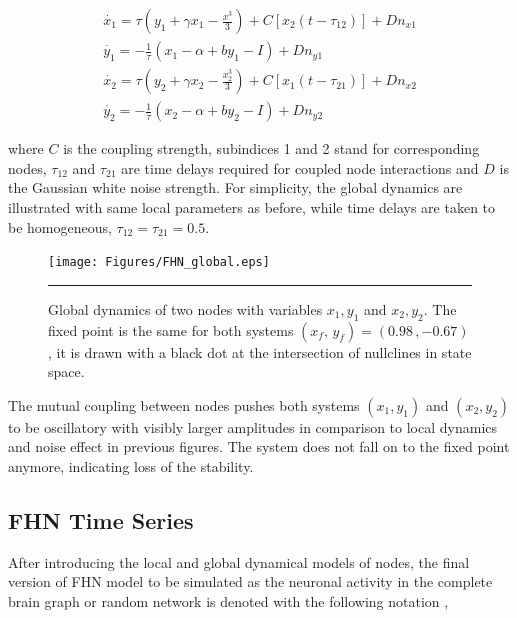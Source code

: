 \begin{subequations}
 \begin{align}\dot{x_1} = \tau (y_1 + \gamma x_1 - \frac{x^3}{3}) + C [x_2(t-\tau_{12})] +Dn_{x1} \label{eqn: frobenius 14}\\  \dot{y_1} = -\frac{1}{\tau} (x_1 - \alpha + b y_1 - I )+ Dn_{y1} \label{eqn: frobenius 15} \\ \dot{x_2} = \tau (y_2 + \gamma x_2 - \frac{x_2^3}{3}) + C [x_1(t-\tau_{21})] + Dn_{x2} \label{eqn: frobenius 16} \\  \dot{y_2} = -\frac{1}{\tau} (x_2 - \alpha + b y_2 - I ) + Dn_{y2}\end{align} 
\end{subequations}
 
where $C$ is the coupling strength, subindices 1 and 2 stand for corresponding nodes, $\tau_{12}$ and $\tau_{21}$ are time delays required for coupled node interactions and $D$ is the Gaussian white noise strength. For simplicity, the global dynamics are illustrated with same local parameters as before, while time delays are taken to be homogeneous, $\tau_{12}=\tau_{21}=0.5$.

\begin{figure}[htbp]
  \centering
	\texttt{[image: Figures/FHN\_global.eps]}
 
    \rule{35em}{0.5pt}
    \caption[FHN Global]{Global dynamics of two nodes with variables $x_1,y_1$ and  $x_2,y_2$. The fixed point is the same for both systems $(x_f, \, y_f) = (0.98 \, , -0.67 )$, it is drawn with a black dot at the intersection of nullclines in state space.}
  \label{fig:FHN Global}	
\end{figure}

The mutual coupling between nodes pushes both systems $(x_1,y_1)$ and $(x_2,y_2)$ to be oscillatory with visibly larger amplitudes in comparison to local dynamics and noise effect in previous figures. The system does not fall on to the fixed point anymore, indicating loss of the stability. 

\subsection{FHN Time Series}

After introducing the local and global dynamical models of nodes, the final version of FHN model to be simulated as the neuronal activity in the complete brain graph or random network is denoted with the following notation \citep{VUK13},  
 
